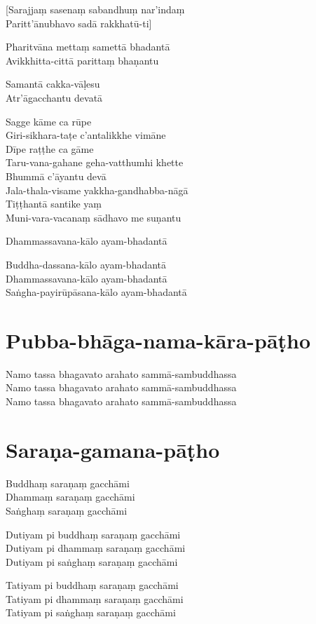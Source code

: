 \begin{paritta}

[Sarajjaṃ sasenaṃ sabandhuṃ nar'indaṃ\\
Paritt'ānubhavo sadā rakkhatū-ti]

%
Pharitvāna mettaṃ samettā bhadantā\\
Avikkhitta-cittā parittaṃ bhaṇantu

%
Samantā cakka-vāḷesu\\
Atr'āgacchantu devatā

Sagge kāme ca rūpe\\
Giri-sikhara-taṭe c'antalikkhe vimāne\\
Dīpe raṭṭhe ca gāme\\
Taru-vana-gahane geha-vatthumhi khette\\
Bhummā c'āyantu devā\\
Jala-thala-visame yakkha-gandhabba-nāgā\\
Tiṭṭhantā santike yaṃ\\
Muni-vara-vacanaṃ sādhavo me suṇantu

Dhammassavana-kālo ayam-bhadantā


Buddha-dassana-kālo ayam-bhadantā\\
Dhammassavana-kālo ayam-bhadantā\\
Saṅgha-payirūpāsana-kālo ayam-bhadantā
\end{paritta}


\section{Pubba-bhāga-nama-kāra-pāṭho}

Namo tassa bhagavato arahato sammā-sambuddhassa\\
Namo tassa bhagavato arahato sammā-sambuddhassa\\
Namo tassa bhagavato arahato sammā-sambuddhassa

\section{Saraṇa-gamana-pāṭho}

\begin{paritta}
Buddhaṃ saraṇaṃ gacchāmi\\
Dhammaṃ saraṇaṃ gacchāmi\\
Saṅghaṃ saraṇaṃ gacchāmi

Dutiyam pi buddhaṃ saraṇaṃ gacchāmi\\
Dutiyam pi dhammaṃ saraṇaṃ gacchāmi\\
Dutiyam pi saṅghaṃ saraṇaṃ gacchāmi

Tatiyam pi buddhaṃ saraṇaṃ gacchāmi\\
Tatiyam pi dhammaṃ saraṇaṃ gacchāmi\\
Tatiyam pi saṅghaṃ saraṇaṃ gacchāmi
\end{paritta}


